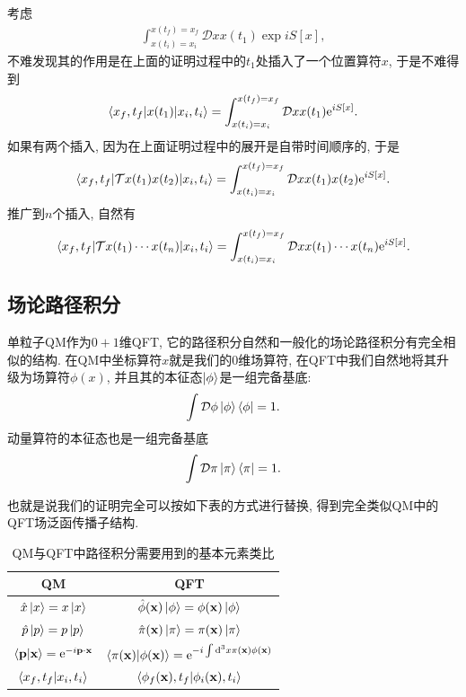 考虑
\begin{align}
    \int_{x(t_i)=x_i}^{x(t_f)=x_f} \mathcal Dx x(t_1)\exp{iS[x]},
\end{align}
不难发现其的作用是在上面的证明过程中的$t_1$处插入了一个位置算符$x$, 于是不难得到
\begin{align}
    \braket{x_f, t_f|x(t_1)|x_i, t_i}=\int_{x(t_i)=x_i}^{x(t_f)=x_f} \mathcal Dx x(t_1)\mathrm e^{iS[x]}.
\end{align}
如果有两个插入, 因为在上面证明过程中的展开是自带时间顺序的, 于是
\begin{align}
    \braket{x_f, t_f|\mathcal Tx(t_1)x(t_2)|x_i, t_i}=\int_{x(t_i)=x_i}^{x(t_f)=x_f} \mathcal Dx x(t_1)x(t_2)\mathrm e^{iS[x]}.
\end{align}
推广到$n$个插入, 自然有
\begin{align}
    \braket{x_f, t_f|\mathcal Tx(t_1)\cdots x(t_n)|x_i, t_i}=\int_{x(t_i)=x_i}^{x(t_f)=x_f} \mathcal Dx x(t_1)\cdots x(t_n)\mathrm e^{iS[x]}.
\end{align}

\subsection{场论路径积分}
单粒子QM作为$0+1$维QFT, 它的路径积分自然和一般化的场论路径积分有完全相似的结构. 在QM中坐标算符$x$就是我们的$0$维场算符, 在QFT中我们自然地将其升级为场算符$\phi(x)$, 并且其的本征态$\ket\phi$是一组完备基底:
\begin{align}
    \int\mathcal D\phi\ket\phi\bra\phi=1.
\end{align}
动量算符的本征态也是一组完备基底
\begin{align}
    \int\mathcal D\pi\ket\pi\bra\pi=1.
\end{align}

也就是说我们的证明完全可以按如下表的方式进行替换, 得到完全类似QM中的QFT场泛函传播子结构.
\begin{table}[!htbp]
    \centering
    \begin{tabular}{c|c}
        QM & QFT\\
        \hline
        $\hat x\ket x=x\ket x$ & $\hat\phi(\mathbf{x})\ket\phi=\phi(\mathbf{x})\ket\phi$\\
        $\hat p\ket p=p\ket p$ & $\hat\pi(\mathbf{x})\ket\pi=\pi(\mathbf{x})\ket\pi$\\
        $\braket{\mathbf{p}|\mathbf{x}}=\mathrm e^{-i\mathbf{p}\cdot\mathbf{x}}$ & $\braket{\pi(\mathbf{x})|\phi(\mathbf{x})}=\mathrm e^{-i\int\mathrm d^3x\pi(\mathbf{x})\phi(\mathbf{x})}$\\
        $\braket{x_f, t_f|x_i, t_i}$ & $\braket{\phi_f(\mathbf{x}), t_f|\phi_i(\mathbf{x}), t_i}$
    \end{tabular}
    \caption{QM与QFT中路径积分需要用到的基本元素类比}
\end{table}

